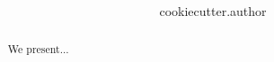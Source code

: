 \documentclass[12pt]{article}
\title{\bfseries \sffamily {{cookiecutter.title}}}
\author{{{cookiecutter.author}}}
\begin{document}
\maketitle

\begin{abstract}
We present...
\end{abstract}





\end{document}
